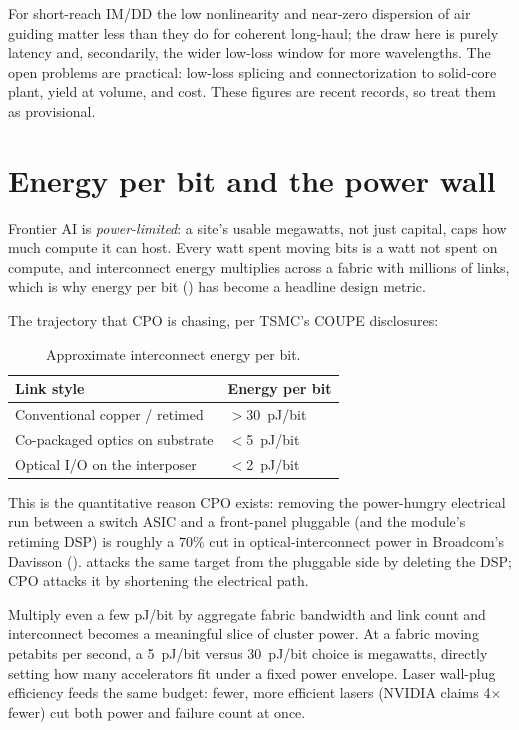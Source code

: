 For short-reach IM/DD the low nonlinearity and near-zero dispersion of air guiding
matter less than they do for coherent long-haul; the draw here is purely latency
and, secondarily, the wider low-loss window for more wavelengths. The open problems
are practical: low-loss splicing and connectorization to solid-core plant, yield at
volume, and cost. These figures are recent records, so treat them as provisional.

\section{Energy per bit and the power wall}
\label{sec:power}

Frontier AI is \emph{power-limited}: a site's usable megawatts, not just capital,
caps how much compute it can host. Every watt spent moving bits is a watt not
spent on compute, and interconnect energy multiplies across a fabric with millions
of links, which is why energy per bit () has become a headline
design metric.

The trajectory that CPO is chasing, per TSMC's COUPE disclosures:

\begin{table}[ht]
\centering
\caption{Approximate interconnect energy per bit.\label{tab:pjbit}}
\renewcommand{\arraystretch}{1.25}%
\begin{tabular}{@{}ll@{}}
\toprule
Link style & Energy per bit \\
\midrule
Conventional copper / retimed & $>$30~pJ/bit \\
\addlinespace[1.5em]
Co-packaged optics on substrate & $<$5~pJ/bit \\
\addlinespace[1.5em]
Optical I/O on the interposer & $<$2~pJ/bit \\
\bottomrule
\end{tabular}
\end{table}

This is the quantitative reason CPO exists: removing the power-hungry electrical
run between a switch ASIC and a front-panel pluggable (and the module's retiming
DSP) is roughly a $70\%$ cut in optical-interconnect power in Broadcom's
Davisson ().  attacks the same target from the
pluggable side by deleting the DSP; CPO attacks it by shortening the electrical
path.

 Multiply even a few pJ/bit by aggregate fabric
bandwidth and link count and interconnect becomes a meaningful slice of cluster
power. At a fabric moving petabits per second, a 5~pJ/bit versus 30~pJ/bit choice
is megawatts, directly setting how many accelerators fit under a fixed power
envelope. Laser wall-plug efficiency feeds the same budget: fewer, more efficient
lasers (NVIDIA claims 4$\times$ fewer) cut both power and failure count at once.


